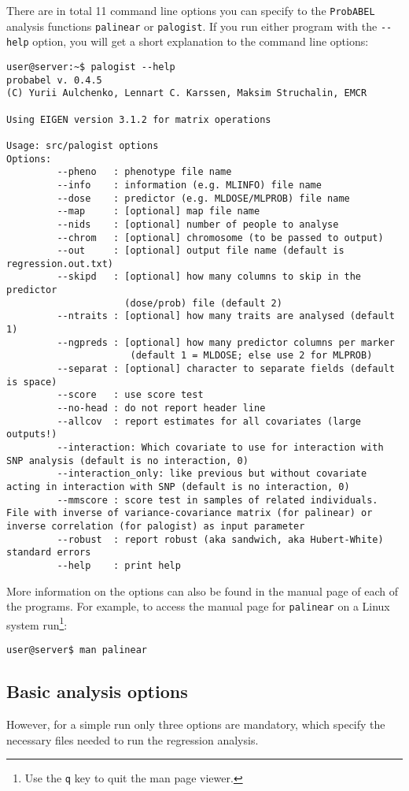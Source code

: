\documentclass[12pt,a4paper]{article}
\newcommand{\PA}{\texttt{ProbABEL}}
\begin{document}
There are in total 11 command line options you can specify to the
\PA{} analysis functions \texttt{palinear} or \texttt{palogist}. If
you run either program with the \lstinline{--help} option, you will get a
short explanation to the command line options:
\begin{verbatim}
user@server:~$ palogist --help
probabel v. 0.4.5
(C) Yurii Aulchenko, Lennart C. Karssen, Maksim Struchalin, EMCR

Using EIGEN version 3.1.2 for matrix operations

Usage: src/palogist options
Options:
         --pheno   : phenotype file name
         --info    : information (e.g. MLINFO) file name
         --dose    : predictor (e.g. MLDOSE/MLPROB) file name
         --map     : [optional] map file name
         --nids    : [optional] number of people to analyse
         --chrom   : [optional] chromosome (to be passed to output)
         --out     : [optional] output file name (default is regression.out.txt)
         --skipd   : [optional] how many columns to skip in the predictor
                     (dose/prob) file (default 2)
         --ntraits : [optional] how many traits are analysed (default 1)
         --ngpreds : [optional] how many predictor columns per marker
                      (default 1 = MLDOSE; else use 2 for MLPROB)
         --separat : [optional] character to separate fields (default is space)
         --score   : use score test
         --no-head : do not report header line
         --allcov  : report estimates for all covariates (large outputs!)
         --interaction: Which covariate to use for interaction with SNP analysis (default is no interaction, 0)
         --interaction_only: like previous but without covariate acting in interaction with SNP (default is no interaction, 0)
         --mmscore : score test in samples of related individuals. File with inverse of variance-covariance matrix (for palinear) or inverse correlation (for palogist) as input parameter
         --robust  : report robust (aka sandwich, aka Hubert-White) standard errors
         --help    : print help
\end{verbatim}
More information on the options can also be found in the manual page
of each of the programs. For example, to access the manual page for
\texttt{palinear} on a Linux system run\footnote{Use the \texttt{q}
  key to quit the man page viewer.}:
\begin{verbatim}
user@server$ man palinear
\end{verbatim}


\subsection{Basic analysis options}
However, for a simple run only three options are mandatory, which
specify the necessary files needed to run the regression analysis.
\end{document}
